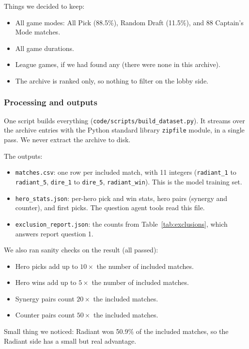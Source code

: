 \documentclass{article}
\begin{document}
Things we decided to keep:
\begin{itemize}
    \item All game modes: All Pick (88.5\%), Random Draft (11.5\%), and 88 Captain's Mode matches.
    \item All game durations.
    \item League games, if we had found any (there were none in this archive).
    \item The archive is ranked only, so nothing to filter on the lobby side.
\end{itemize}

\subsubsection*{Processing and outputs}
One script builds everything (\texttt{code/scripts/build\_dataset.py}). It streams over the archive entries with the Python standard library \texttt{zipfile} module, in a single pass. We never extract the archive to disk.

The outputs:
\begin{itemize}
    \item \texttt{matches.csv}: one row per included match, with 11 integers (\texttt{radiant\_1} to \texttt{radiant\_5}, \texttt{dire\_1} to \texttt{dire\_5}, \texttt{radiant\_win}). This is the model training set.
    \item \texttt{hero\_stats.json}: per-hero pick and win stats, hero pairs (synergy and counter), and first picks. The question agent tools read this file.
    \item \texttt{exclusion\_report.json}: the counts from Table~\ref{tab:exclusions}, which answers report question 1.
\end{itemize}

We also ran sanity checks on the result (all passed):
\begin{itemize}
    \item Hero picks add up to $10 \times$ the number of included matches.
    \item Hero wins add up to $5 \times$ the number of included matches.
    \item Synergy pairs count $20 \times$ the included matches.
    \item Counter pairs count $50 \times$ the included matches.
\end{itemize}

Small thing we noticed: Radiant won 50.9\% of the included matches, so the Radiant side has a small but real advantage.
\end{document}
